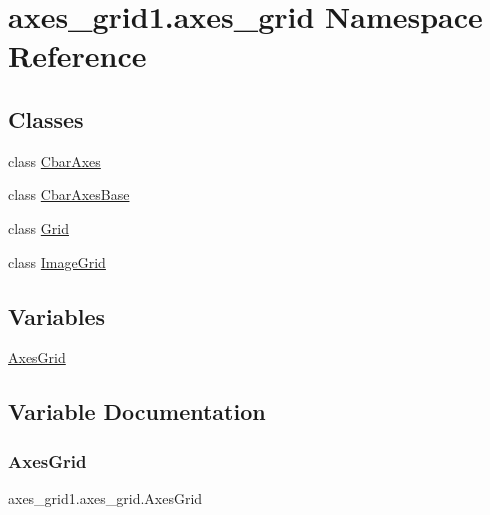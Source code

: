 \hypertarget{namespaceaxes__grid1_1_1axes__grid}{}\section{axes\+\_\+grid1.\+axes\+\_\+grid Namespace Reference}
\label{namespaceaxes__grid1_1_1axes__grid}
\subsection*{Classes}
\begin{DoxyCompactItemize}
\item 
class \hyperlink{classaxes__grid1_1_1axes__grid_1_1CbarAxes}{Cbar\+Axes}
\item 
class \hyperlink{classaxes__grid1_1_1axes__grid_1_1CbarAxesBase}{Cbar\+Axes\+Base}
\item 
class \hyperlink{classaxes__grid1_1_1axes__grid_1_1Grid}{Grid}
\item 
class \hyperlink{classaxes__grid1_1_1axes__grid_1_1ImageGrid}{Image\+Grid}
\end{DoxyCompactItemize}
\subsection*{Variables}
\begin{DoxyCompactItemize}
\item 
\hyperlink{namespaceaxes__grid1_1_1axes__grid_a01b18153e5f3da33bab132bbb8138806}{Axes\+Grid}
\end{DoxyCompactItemize}


\subsection{Variable Documentation}
\mbox{\label{namespaceaxes__grid1_1_1axes__grid_a01b18153e5f3da33bab132bbb8138806}} 
\subsubsection{\texorpdfstring{Axes\+Grid}{AxesGrid}}
{\footnotesize\ttfamily axes\+\_\+grid1.\+axes\+\_\+grid.\+Axes\+Grid}

